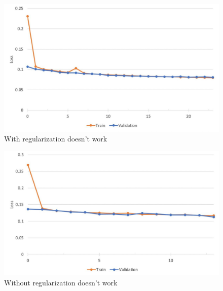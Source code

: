 
\begin{figure}[H]
	\begin{center}
		\includegraphics[width=0.5\linewidth]{bilder/golgi/with-regularization.jpg}
		\caption{With regularization doesn't work}\label{fig:golgi-reg}
	\end{center}
\end{figure}

\begin{figure}[H]
	\begin{center}
		\includegraphics[width=0.5\linewidth]{bilder/golgi/without-regularization.jpg}
		\caption{Without regularization doesn't work}\label{fig:golgi-no-reg}
	\end{center}
\end{figure}